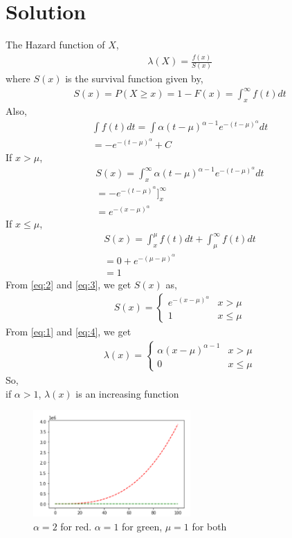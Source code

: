 \documentclass[journal,12pt,twocolumn]{IEEEtran}
\begin{document}
\section*{\textbf{Solution}}
The Hazard function of $X$,
\begin{align}
\lambda(X) = \frac{f(x)}{S(x)} \label{eq:1}
\end{align}
where $S(x)$ is the survival function given by,
\begin{align}
S(x) = P(X \geq x) = 1-F(x) = \int_{x}^{\infty}f(t)dt
\end{align}
Also, 
\begin{align}
\int f(t)dt=\int \alpha(t-\mu)^{\alpha-1}e^{-(t-\mu)^\alpha}dt\\
=-e^{-(t-\mu)^\alpha} + C
\end{align}
If $x>\mu$, 
\begin{align}
S(x) = \int_{x}^{\infty} \alpha(t-\mu)^{\alpha-1}e^{-(t-\mu)^\alpha}dt\\
=-e^{-(t-\mu)^\alpha}]_{x}^{\infty}\\
=e^{-(x-\mu)^{\alpha}} \label{eq:2}
\end{align}
If $x\leq\mu$,
\begin{align}
S(x) = \int_{x}^{\mu}f(t)dt + \int_{\mu}^{\infty}f(t)dt\\
     = 0 + e^{-(\mu-\mu)^{\alpha}}\\
     =1 \label{eq:3}
\end{align}
From \eqref{eq:2} and \eqref{eq:3}, we get $S(x)$ as,
\begin{align}
S(x)=
\begin{cases}
e^{-(x-\mu)^\alpha} &x>\mu\\
1 &x\leq\mu \label{eq:4}
\end{cases}
\end{align}
From \eqref{eq:1} and \eqref{eq:4}, we get
\begin{align}
\lambda(x) = 
\begin{cases}
\alpha(x-\mu)^{\alpha-1} &x>\mu\\
0 &x\leq\mu \label{eq:5}
\end{cases}
\end{align}
So,\\ if $\alpha>1$, $\lambda(x)$ is an increasing function
\begin{figure}[htp]
    \centering
    \includegraphics[width=6cm]{alphagrt1.png}
    \caption{$\alpha=2$ for red. $\alpha=1$ for green, $\mu=1$ for both}
    \label{fig:grt1}
\end{figure}
\end{document}
